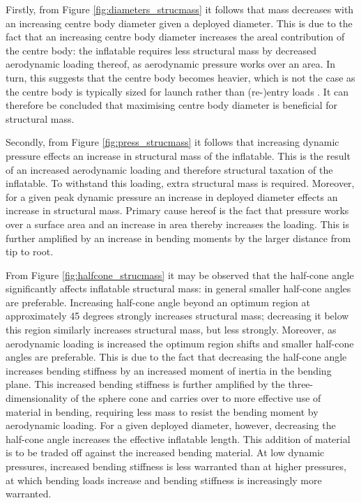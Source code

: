 Firstly, from Figure \ref{fig:diameters_strucmass} it follows that mass decreases with an increasing centre body diameter given a deployed diameter. This is due to the fact that an increasing centre body diameter increases the areal contribution of the centre body: the inflatable requires less structural mass by decreased aerodynamic loading thereof, as aerodynamic pressure works over an area. In turn, this suggests that the centre body becomes heavier, which is not the case as the centre body is typically sized for launch rather than (re-)entry loads \cite{Lindell2006}. It can therefore be concluded that maximising centre body diameter is beneficial for structural mass. 

Secondly, from Figure \ref{fig:press_strucmass} it follows that increasing dynamic pressure effects an increase in structural mass of the inflatable. This is the result of an increased aerodynamic loading and therefore structural taxation of the inflatable. To withstand this loading, extra structural mass is required. Moreover, for a given peak dynamic pressure an increase in deployed diameter effects an increase in structural mass. Primary cause hereof is the fact that pressure works over a surface area and an increase in area thereby increases the loading. This is further amplified by an increase in bending moments by the larger distance from tip to root.

From Figure \ref{fig:halfcone_strucmass} it may be observed that the half-cone angle significantly affects inflatable structural mass: in general smaller half-cone angles are preferable. Increasing half-cone angle beyond an optimum region at approximately 45 degrees strongly increases structural mass; decreasing it below this region similarly increases structural mass, but less strongly. Moreover, as aerodynamic loading is increased the optimum region shifts and smaller half-cone angles are preferable. This is due to the fact that decreasing the half-cone angle increases bending stiffness by an increased moment of inertia in the bending plane. This increased bending stiffness is further amplified by the three-dimensionality of the sphere cone and carries over to more effective use of material in bending, requiring less mass to resist the bending moment by aerodynamic loading. For a given deployed diameter, however, decreasing the half-cone angle increases the effective inflatable length. This addition of material is to be traded off against the increased bending material. At low dynamic pressures, increased bending stiffness is less warranted than at higher pressures, at which bending loads increase and bending stiffness is increasingly more warranted.

